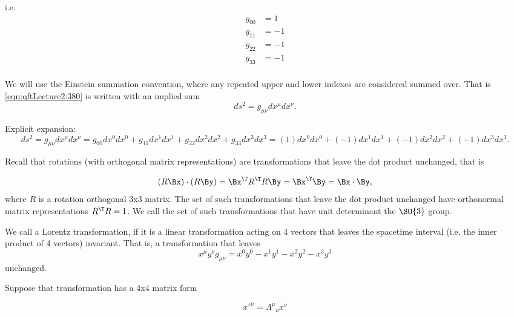 i.e.
\begin{dmath}\label{eqn:qftLecture2:420}
\begin{aligned}
g_{00} &= 1 \\
g_{11} &= -1 \\
g_{22} &= -1 \\
g_{33} &= -1 \\
\end{aligned}
\end{dmath}

We will use the Einstein summation convention, where any repeated upper and lower indexes are considered summed over.  That is \cref{eqn:qftLecture2:380} is written with an implied sum
\begin{dmath}\label{eqn:qftLecture2:440}
ds^2 = g_{\mu\nu} dx^\mu dx^\nu.
\end{dmath}

Explicit expansion:
\begin{dmath}\label{eqn:qftLecture2:460}
ds^2 = g_{\mu\nu} dx^\mu dx^\nu
=
g_{00} dx^0 dx^0
+g_{11} dx^1 dx^1
+g_{22} dx^2 dx^2
+g_{33} dx^3 dx^3
=
(1) dx^0 dx^0
+ (-1) dx^1 dx^1
+ (-1) dx^2 dx^2
+ (-1) dx^3 dx^3.
\end{dmath}

Recall that rotations (with orthogonal matrix representations) are transformations that leave the dot product unchanged, that is

\begin{dmath}\label{eqn:qftLecture2:480}
(R \Bx) \cdot (R \By)
= \Bx^\T R^\T R \By
= \Bx^\T \By
= \Bx \cdot \By,
\end{dmath}
%
where \( R \) is a rotation orthogonal 3x3 matrix.  The set of such transformations that leave the dot product unchanged have orthonormal matrix representations \( R^\T R = 1 \).  We call the set of such transformations that have unit determinant the \(\SO{3}\) group.

We call a Lorentz transformation, if it is a linear transformation acting on 4 vectors that leaves the spacetime interval (i.e. the inner product of 4 vectors) invariant.  That is, a transformation that leaves
\begin{dmath}\label{eqn:qftLecture2:500}
x^\mu y^\nu g_{\mu\nu} = x^0 y^0 - x^1 y^1 - x^2 y^2 - x^3 y^3
\end{dmath}
unchanged.

Suppose that transformation has a 4x4 matrix form

\begin{dmath}\label{eqn:qftLecture2:520}
{x'}^\mu = {\Lambda^\mu}_\nu x^\nu
\end{dmath}

